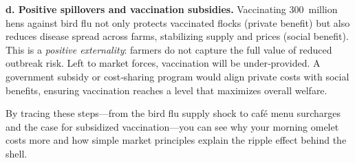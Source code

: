 \documentclass[12pt]{article}
\begin{document}
\begin{doublespace}
\textbf{d. Positive spillovers and vaccination subsidies.} Vaccinating 300 million hens against bird flu not only protects vaccinated flocks (private benefit) but also reduces disease spread across farms, stabilizing supply and prices (social benefit). This is a \emph{positive externality}: farmers do not capture the full value of reduced outbreak risk. Left to market forces, vaccination will be under‐provided. A government subsidy or cost‐sharing program would align private costs with social benefits, ensuring vaccination reaches a level that maximizes overall welfare.

By tracing these steps—from the bird flu supply shock to café menu surcharges and the case for subsidized vaccination—you can see why your morning omelet costs more and how simple market principles explain the ripple effect behind the shell.

\end{doublespace}
\end{document}
